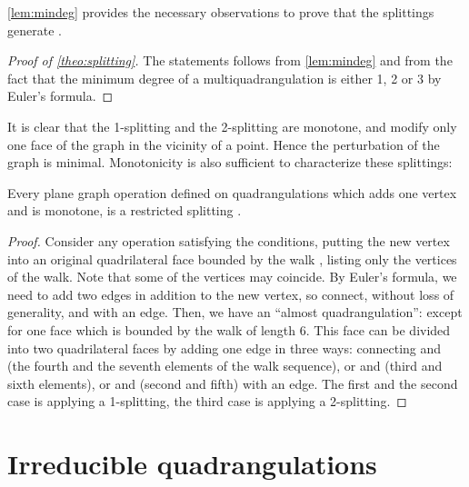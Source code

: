 \documentclass[]{article}
\begin{document}
\autoref{lem:mindeg} provides the necessary observations to prove that the splittings  generate .

\begin{proof}[Proof of \autoref*{theo:splitting}]
The statements follows from \autoref{lem:mindeg} and from the fact that the minimum degree of a multiquadrangulation is either 1, 2 or 3 by Euler's formula.
\end{proof}

It is clear that the 1-splitting and the 2-splitting are monotone, and modify only one face of the graph in the vicinity of a point.
Hence the perturbation of the graph is minimal.
Monotonicity is also sufficient to characterize these splittings:

\begin{prop}
  \label{prop:monotone}
  Every plane graph operation defined on quadrangulations which adds one vertex and is monotone, is a restricted splitting .
\end{prop}

\begin{proof}
  Consider any operation satisfying the conditions, putting the new vertex  into an original quadrilateral face bounded by the walk , listing only the vertices of the walk.
  Note that some of the vertices  may coincide.
  By Euler's formula, we need to add two edges in addition to the new vertex, so connect, without loss of generality,  and  with an edge.
  Then, we have an ``almost quadrangulation'': except for one face which is bounded by the walk  of length 6.
  This face can be divided into two quadrilateral faces by adding one edge in three ways: connecting  and  (the fourth and the seventh elements of the walk sequence), or  and  (third and sixth elements), or  and  (second and fifth) with an edge.
  The first and the second case is applying a 1-splitting, the third case is applying a 2-splitting.
\end{proof}


\section{Irreducible quadrangulations}
\label{sec:irreducible}
\end{document}

